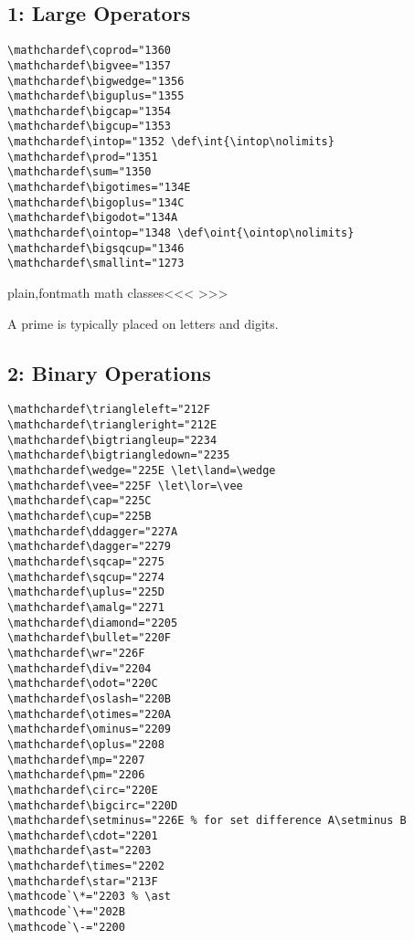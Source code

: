 {{{{{{\subsection{1: Large Operators}

\begin{verbatim}
\mathchardef\coprod="1360
\mathchardef\bigvee="1357
\mathchardef\bigwedge="1356
\mathchardef\biguplus="1355
\mathchardef\bigcap="1354
\mathchardef\bigcup="1353
\mathchardef\intop="1352 \def\int{\intop\nolimits}
\mathchardef\prod="1351
\mathchardef\sum="1350
\mathchardef\bigotimes="134E
\mathchardef\bigoplus="134C
\mathchardef\bigodot="134A
\mathchardef\ointop="1348 \def\oint{\ointop\nolimits}
\mathchardef\bigsqcup="1346
\mathchardef\smallint="1273
\end{verbatim}

\<plain,fontmath math classes\><<<
>>>


A prime is typically  placed on letters and digits.


\subsection{2: Binary Operations}

\begin{verbatim}
\mathchardef\triangleleft="212F
\mathchardef\triangleright="212E
\mathchardef\bigtriangleup="2234
\mathchardef\bigtriangledown="2235
\mathchardef\wedge="225E \let\land=\wedge
\mathchardef\vee="225F \let\lor=\vee
\mathchardef\cap="225C
\mathchardef\cup="225B
\mathchardef\ddagger="227A
\mathchardef\dagger="2279
\mathchardef\sqcap="2275
\mathchardef\sqcup="2274
\mathchardef\uplus="225D
\mathchardef\amalg="2271
\mathchardef\diamond="2205
\mathchardef\bullet="220F
\mathchardef\wr="226F
\mathchardef\div="2204
\mathchardef\odot="220C
\mathchardef\oslash="220B
\mathchardef\otimes="220A
\mathchardef\ominus="2209
\mathchardef\oplus="2208
\mathchardef\mp="2207
\mathchardef\pm="2206
\mathchardef\circ="220E
\mathchardef\bigcirc="220D
\mathchardef\setminus="226E % for set difference A\setminus B
\mathchardef\cdot="2201
\mathchardef\ast="2203
\mathchardef\times="2202
\mathchardef\star="213F
\mathcode`\*="2203 % \ast
\mathcode`\+="202B
\mathcode`\-="2200
\end{verbatim}

}}}}}}
